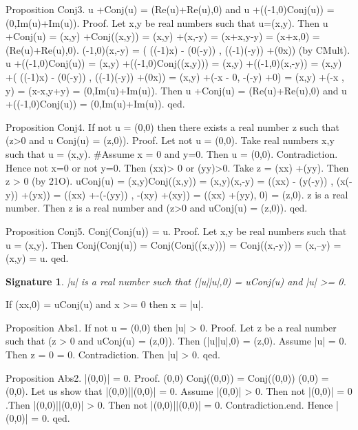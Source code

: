 \documentclass{article}
\newenvironment{forthel}{\begin{leftbar}}{\end{leftbar}}
\newtheorem{axiom}{\begin{axiom} }
\newtheorem{signature}{Signature}
\newcommand{\cmul}{\cdot}
\newcommand{\rmul}{\cdot}
\newcommand{\cadd}{+}
\newcommand{\radd}{+}
\begin{document}
\begin{forthel}
Proposition Conj3. u \cadd  Conj(u) = (Re(u)\radd Re(u),0) and u \cadd  ((-1,0)\cmul Conj(u)) = (0,Im(u)\radd Im(u)).
Proof. Let x,y be real numbers such that u=(x,y).
	   Then u \cadd  Conj(u) = (x,y) \cadd  Conj((x,y)) = (x,y) \cadd  (x,-y) = (x\radd x,y-y) = (x\radd x,0) = (Re(u)\radd Re(u),0).
	   (-1,0)\cmul (x,-y) = ( ((-1)\rmul x) - (0\rmul (-y)) , ((-1)\rmul (-y)) \radd  (0\rmul x)) (by CMult).
	   u \cadd  ((-1,0)\cmul Conj(u))	= (x,y) \cadd  ((-1,0)\cmul Conj((x,y))) = (x,y) \cadd  ((-1,0)\cmul (x,-y)) 
	   							= (x,y) \cadd  ( ((-1)\rmul x) - (0\rmul (-y)) , ((-1)\rmul (-y)) \radd  (0\rmul x))
	   							= (x,y) \cadd  (-x - 0, -(-y) \radd  0)
	   							= (x,y) \cadd  (-x , y) = (x-x,y\radd y) = (0,Im(u)\radd Im(u)).
	   	Then u \cadd  Conj(u) = (Re(u)\radd Re(u),0) and u \cadd  ((-1,0)\cmul Conj(u)) = (0,Im(u)\radd Im(u)).
qed.	   

Proposition Conj4. If not u = (0,0) then there exists a real number z such that (z>0 and u \cmul  Conj(u) = (z,0)).
Proof.	Let not u = (0,0).
	   	Take real numbers x,y such that u = (x,y).
	   	#Assume x = 0 and y=0. Then u = (0,0). Contradiction. Hence not x=0 or not y=0.
		Then (x\rmul x)> 0 or (y\rmul y)>0. Take z = (x\rmul x) \radd  (y\rmul y). 
		Then z > 0 (by 21O).
		u\cmul Conj(u) = (x,y)\cmul Conj((x,y)) = (x,y)\cmul (x,-y) = ((x\rmul x) - (y\rmul (-y)) , (x\rmul (-y)) \radd  (y\rmul x)) = ((x\rmul x) \radd  -(-(y\rmul y)) , -(x\rmul y) \radd  (x\rmul y)) = ((x\rmul x) \radd  (y\rmul y), 0) = (z,0).
		z is a real number.
		Then z is a real number and (z>0 and u\cmul Conj(u) = (z,0)).
qed.

Proposition Conj5. Conj(Conj(u)) = u.
Proof. 	Let x,y be real numbers such that u = (x,y).
		Then Conj(Conj(u)) = Conj(Conj((x,y))) = Conj((x,-y)) = (x,--y) = (x,y) = u. qed.


\begin{signature} |u| is a real number such that (|u|\rmul |u|,0) = u\cmul Conj(u) and |u| >= 0. 
\end{signature}
\begin{axiom}[EindAbs] If (x\rmul x,0) = u\cmul Conj(u) and x >= 0 then x = |u|.
\end{axiom}



Proposition Abs1. If not u = (0,0) then |u| > 0.
Proof.  Let z be a real number such that (z > 0 and u\cmul Conj(u) = (z,0)). Then (|u|\rmul |u|,0) = (z,0).
		Assume |u| = 0. Then z = 0\rmul 0 = 0. Contradiction. 
		Then |u| > 0.
qed.

Proposition Abs2. |(0,0)| = 0.
Proof. 	(0,0) \cmul  Conj((0,0)) = Conj((0,0)) \cmul  (0,0) = (0,0). 
		Let us show that |(0,0)|\rmul |(0,0)| = 0.
		Assume |(0,0)| > 0. Then not |(0,0)| = 0 .Then |(0,0)|\rmul |(0,0)| > 0. Then not |(0,0)|\rmul |(0,0)| = 0. Contradiction.end. 
		Hence |(0,0)| = 0.
qed.


\end{forthel}
\end{document}
